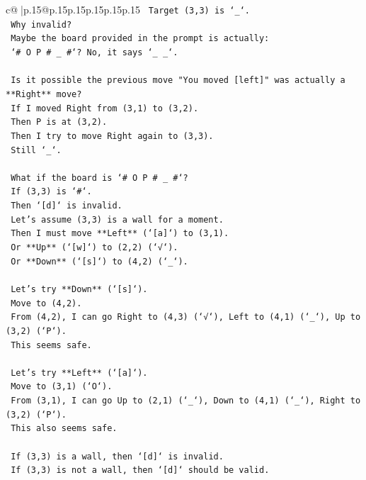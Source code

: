 \documentclass{article}
\begin{document}
{\begin{supertabular}{c@{$\;$}|p{.15\linewidth}@{}p{.15\linewidth}p{.15\linewidth}p{.15\linewidth}p{.15\linewidth}p{.15\linewidth}}
{{{\texttt{    Target (3,3) is `\_`.} \\
\texttt{    Why invalid?} \\
\texttt{    Maybe the board provided in the prompt is actually:} \\
\texttt{    `\# O P \# \_ \#`? No, it says `\_ \_`.} \\
\\ 
\texttt{    Is it possible the previous move "You moved {[}left{]}" was actually a **Right** move?} \\
\texttt{    If I moved Right from (3,1) to (3,2).} \\
\texttt{    Then P is at (3,2).} \\
\texttt{    Then I try to move Right again to (3,3).} \\
\texttt{    Still `\_`.} \\
\\ 
\texttt{    What if the board is `\# O P \# \_ \#`?} \\
\texttt{    If (3,3) is `\#`.} \\
\texttt{    Then `{[}d{]}` is invalid.} \\
\texttt{    Let's assume (3,3) is a wall for a moment.} \\
\texttt{    Then I must move **Left** (`{[}a{]}`) to (3,1).} \\
\texttt{    Or **Up** (`{[}w{]}`) to (2,2) (`√`).} \\
\texttt{    Or **Down** (`{[}s{]}`) to (4,2) (`\_`).} \\
\\ 
\texttt{    Let's try **Down** (`{[}s{]}`).} \\
\texttt{    Move to (4,2).} \\
\texttt{    From (4,2), I can go Right to (4,3) (`√`), Left to (4,1) (`\_`), Up to (3,2) (`P`).} \\
\texttt{    This seems safe.} \\
\\ 
\texttt{    Let's try **Left** (`{[}a{]}`).} \\
\texttt{    Move to (3,1) (`O`).} \\
\texttt{    From (3,1), I can go Up to (2,1) (`\_`), Down to (4,1) (`\_`), Right to (3,2) (`P`).} \\
\texttt{    This also seems safe.} \\
\\ 
\texttt{    If (3,3) is a wall, then `{[}d{]}` is invalid.} \\
\texttt{    If (3,3) is not a wall, then `{[}d{]}` should be valid.} \\
}}}
\end{supertabular}}
\end{document}
